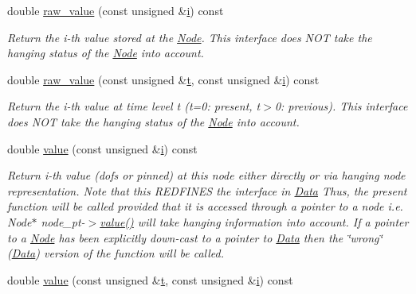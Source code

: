 \begin{DoxyCompactItemize}
double \hyperlink{classoomph_1_1Node_abc9f54df56cbe8eedc6f1595c7d7f11e}{raw\+\_\+value} (const unsigned \&\hyperlink{cfortran_8h_adb50e893b86b3e55e751a42eab3cba82}{i}) const
\begin{DoxyCompactList}\small\item\em Return the i-\/th value stored at the \hyperlink{classoomph_1_1Node}{Node}. This interface does N\+OT take the hanging status of the \hyperlink{classoomph_1_1Node}{Node} into account. \end{DoxyCompactList}\item 
double \hyperlink{classoomph_1_1Node_aec4e3050f0b7b85ef2ffb11a12c64214}{raw\+\_\+value} (const unsigned \&\hyperlink{cfortran_8h_af6f0bd3dc13317f895c91323c25c2b8f}{t}, const unsigned \&\hyperlink{cfortran_8h_adb50e893b86b3e55e751a42eab3cba82}{i}) const
\begin{DoxyCompactList}\small\item\em Return the i-\/th value at time level t (t=0\+: present, t$>$0\+: previous). This interface does N\+OT take the hanging status of the \hyperlink{classoomph_1_1Node}{Node} into account. \end{DoxyCompactList}\item 
double \hyperlink{classoomph_1_1Node_afcc5cdba40bca251826ae5bee5ca15b4}{value} (const unsigned \&\hyperlink{cfortran_8h_adb50e893b86b3e55e751a42eab3cba82}{i}) const
\begin{DoxyCompactList}\small\item\em Return i-\/th value (dofs or pinned) at this node either directly or via hanging node representation. Note that this R\+E\+D\+F\+I\+N\+ES the interface in \hyperlink{classoomph_1_1Data}{Data} Thus, the present function will be called provided that it is accessed through a pointer to a node i.\+e. Node$\ast$ node\+\_\+pt-\/$>$\hyperlink{classoomph_1_1Node_afcc5cdba40bca251826ae5bee5ca15b4}{value()} will take hanging information into account. If a pointer to a \hyperlink{classoomph_1_1Node}{Node} has been explicitly down-\/cast to a pointer to \hyperlink{classoomph_1_1Data}{Data} then the \char`\"{}wrong\char`\"{} (\hyperlink{classoomph_1_1Data}{Data}) version of the function will be called. \end{DoxyCompactList}\item 
double \hyperlink{classoomph_1_1Node_a9865f3f77710b04934c1ca07510453b8}{value} (const unsigned \&\hyperlink{cfortran_8h_af6f0bd3dc13317f895c91323c25c2b8f}{t}, const unsigned \&\hyperlink{cfortran_8h_adb50e893b86b3e55e751a42eab3cba82}{i}) const

\end{DoxyCompactItemize}
